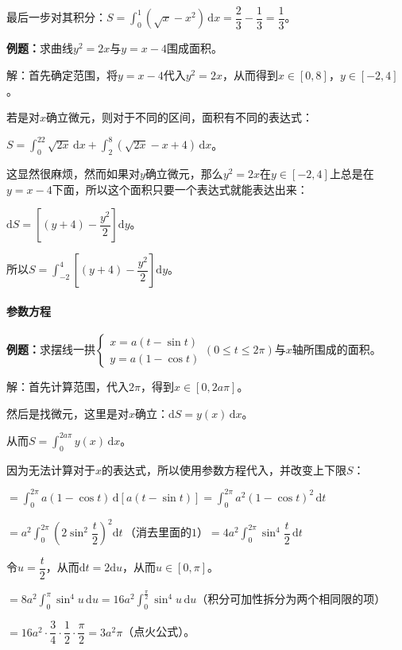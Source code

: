 \documentclass[UTF8, 12pt]{ctexart}
\begin{document}
最后一步对其积分：$S=\int_0^1(\sqrt{x}-x^2)\,\textrm{d}x=\dfrac{2}{3}-\dfrac{1}{3}=\dfrac{1}{3}$。

\textbf{例题：}求曲线$y^2=2x$与$y=x-4$围成面积。

解：首先确定范围，将$y=x-4$代入$y^2=2x$，从而得到$x\in[0,8]$，$y\in[-2,4]$。

若是对$x$确立微元，则对于不同的区间，面积有不同的表达式：

$S=\int_0^22\sqrt{2x}\,\textrm{d}x+\int_2^8(\sqrt{2x}-x+4)\,\textrm{d}x$。

这显然很麻烦，然而如果对$y$确立微元，那么$y^2=2x$在$y\in[-2,4]$上总是在$y=x-4$下面，所以这个面积只要一个表达式就能表达出来：

$\textrm{d}S=\left[(y+4)-\dfrac{y^2}{2}\right]\textrm{d}y$。

所以$S=\displaystyle{\int_{-2}^4\left[(y+4)-\dfrac{y^2}{2}\right]\textrm{d}y}$。

\paragraph{参数方程} \leavevmode \medskip

\textbf{例题：}求摆线一拱$\left\{\begin{array}{l}
    x=a(t-\sin t) \\
    y=a(1-\cos t)
\end{array}
\right.$$(0\leqslant t\leqslant 2\pi)$与$x$轴所围成的面积。\medskip

解：首先计算范围，代入$2\pi$，得到$x\in[0,2a\pi]$。

然后是找微元，这里是对$x$确立：$\textrm{d}S=y(x)\,\textrm{d}x$。

从而$S=\int_0^{2a\pi}y(x)\,\textrm{d}x$。

因为无法计算对于$x$的表达式，所以使用参数方程代入，并改变上下限$S$：

$=\int_0^{2\pi}a(1-\cos t)\,\textrm{d}[a(t-\sin t)]=\int_0^{2\pi}a^2(1-\cos t)^2\,\textrm{d}t$

$=a^2\displaystyle{\int_0^{2\pi}\left(2\sin^2\dfrac{t}{2}\right)^2\textrm{d}t}\,\text{（消去里面的1）}=4a^2\displaystyle{\int_0^{2\pi}\sin^4\dfrac{t}{2}\,\textrm{d}t}$

令$u=\dfrac{t}{2}$，从而$\textrm{d}t=2\textrm{d}u$，从而$u\in[0,\pi]$。

$=8a^2\int_0^\pi\sin^4u\,\textrm{d}u=16a^2\int_0^{\frac{\pi}{2}}\sin^4u\,\textrm{d}u$（积分可加性拆分为两个相同限的项）

$=16a^2\cdot\dfrac{3}{4}\cdot\dfrac{1}{2}\cdot\dfrac{\pi}{2}=3a^2\pi$（点火公式）。
\end{document}
